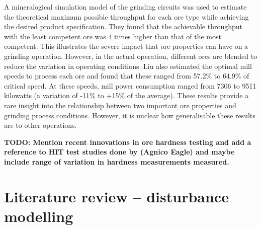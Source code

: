 A mineralogical simulation model of the grinding circuits was used to estimate the theoretical maximum possible throughput for each ore type while achieving the desired product specification. They found that the achievable throughput with the least competent ore was 4 times higher than that of the most competent. This illustrates the severe impact that ore properties can have on a grinding operation. However, in the actual operation, different ores are blended to reduce the variation in operating conditions. Liu also estimated the optimal mill speeds to process each ore and found that these ranged from 57.2\% to 64.9\% of critical speed. At these speeds, mill power consumption ranged from 7306 to 9511 kilowatts (a variation of -11\% to +15\% of the average). These results provide a rare insight into the relationship between two important ore properties and grinding process conditions. However, it is unclear how generalisable these results are to other operations.

\textbf{TODO: Mention recent innovations in ore hardness testing and add a reference to HIT test studies done by \cite{kojovic_value_2019} (Agnico Eagle) and maybe include range of variation in hardness measurements measured.}


\section{Literature review – disturbance modelling}


